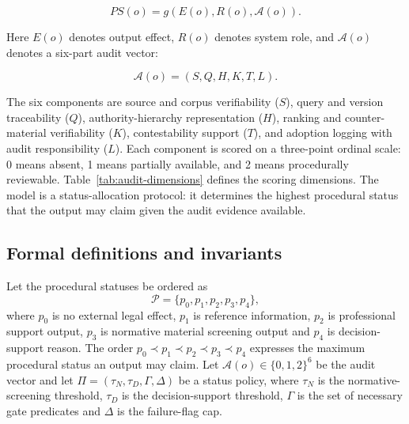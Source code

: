 \documentclass[12pt,a4paper]{article}
\begin{document}
\[
PS(o)=g(E(o),R(o),\mathcal{A}(o)).
\]

Here $E(o)$ denotes output effect, $R(o)$ denotes system role, and $\mathcal{A}(o)$ denotes a six-part audit vector:

\[
\mathcal{A}(o)=(S,Q,H,K,T,L).
\]

The six components are source and corpus verifiability ($S$), query and version traceability ($Q$), authority-hierarchy representation ($H$), ranking and counter-material verifiability ($K$), contestability support ($T$), and adoption logging with audit responsibility ($L$). Each component is scored on a three-point ordinal scale: 0 means absent, 1 means partially available, and 2 means procedurally reviewable. Table~\ref{tab:audit-dimensions} defines the scoring dimensions. The model is a status-allocation protocol: it determines the highest procedural status that the output may claim given the audit evidence available.

\subsection{Formal definitions and invariants}

Let the procedural statuses be ordered as
\[
\mathcal{P}=\{p_0,p_1,p_2,p_3,p_4\},
\]
where $p_0$ is no external legal effect, $p_1$ is reference information, $p_2$ is professional support output, $p_3$ is normative material screening output and $p_4$ is decision-support reason. The order $p_0\prec p_1\prec p_2\prec p_3\prec p_4$ expresses the maximum procedural status an output may claim. Let $\mathcal{A}(o)\in\{0,1,2\}^{6}$ be the audit vector and let $\Pi=(\tau_N,\tau_D,\Gamma,\Delta)$ be a status policy, where $\tau_N$ is the normative-screening threshold, $\tau_D$ is the decision-support threshold, $\Gamma$ is the set of necessary gate predicates and $\Delta$ is the failure-flag cap.
\end{document}
